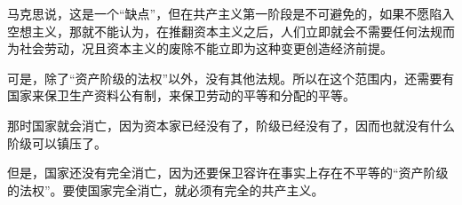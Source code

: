 马克思说，这是一个“缺点”，但在共产主义第一阶段是不可避免的，如果不愿陷入空想主义，那就不能认为，在推翻资本主义之后，人们立即就会{\kaishu 不需要任何法规}而为社会劳动，况且资本主义的废除{\kaishu 不能立即为这种}变更{\kaishu 创造}经济前提。

可是，除了“资产阶级的法权”以外，没有其他法规。所以在这个范围内，还需要有国家来保卫生产资料公有制，来保卫劳动的平等和分配的平等。

那时国家就会消亡，因为资本家已经没有了，阶级已经没有了，因而也就没有什么{\kaishu 阶级}可以{\kaishu 镇压}了。

但是，国家还没有完全消亡，因为还要保卫容许在事实上存在不平等的“资产阶级的法权”。要使国家完全消亡，就必须有完全的共产主义。






